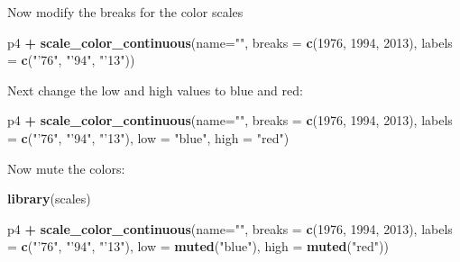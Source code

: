 \documentclass[]{book}
\newenvironment{Shaded}{\begin{snugshade}}{\end{snugshade}}
\newcommand{\KeywordTok}[1]{\textcolor[rgb]{0.13,0.29,0.53}{\textbf{#1}}}
\newcommand{\DataTypeTok}[1]{\textcolor[rgb]{0.13,0.29,0.53}{#1}}
\newcommand{\DecValTok}[1]{\textcolor[rgb]{0.00,0.00,0.81}{#1}}
\newcommand{\StringTok}[1]{\textcolor[rgb]{0.31,0.60,0.02}{#1}}
\newcommand{\OperatorTok}[1]{\textcolor[rgb]{0.81,0.36,0.00}{\textbf{#1}}}
\newcommand{\NormalTok}[1]{#1}
\begin{document}
Now modify the breaks for the color scales

\begin{Shaded}
\begin{Highlighting}[]
\NormalTok{p4 }\OperatorTok{+}\StringTok{ }
\StringTok{  }\KeywordTok{scale_color_continuous}\NormalTok{(}\DataTypeTok{name=}\StringTok{""}\NormalTok{,}
                         \DataTypeTok{breaks =} \KeywordTok{c}\NormalTok{(}\DecValTok{1976}\NormalTok{, }\DecValTok{1994}\NormalTok{, }\DecValTok{2013}\NormalTok{),}
                         \DataTypeTok{labels =} \KeywordTok{c}\NormalTok{(}\StringTok{"'76"}\NormalTok{, }\StringTok{"'94"}\NormalTok{, }\StringTok{"'13"}\NormalTok{))}
\end{Highlighting}
\end{Shaded}

Next change the low and high values to blue and red:

\begin{Shaded}
\begin{Highlighting}[]
\NormalTok{p4 }\OperatorTok{+}
\StringTok{  }\KeywordTok{scale_color_continuous}\NormalTok{(}\DataTypeTok{name=}\StringTok{""}\NormalTok{,}
                         \DataTypeTok{breaks =} \KeywordTok{c}\NormalTok{(}\DecValTok{1976}\NormalTok{, }\DecValTok{1994}\NormalTok{, }\DecValTok{2013}\NormalTok{),}
                         \DataTypeTok{labels =} \KeywordTok{c}\NormalTok{(}\StringTok{"'76"}\NormalTok{, }\StringTok{"'94"}\NormalTok{, }\StringTok{"'13"}\NormalTok{),}
                         \DataTypeTok{low =} \StringTok{"blue"}\NormalTok{, }\DataTypeTok{high =} \StringTok{"red"}\NormalTok{)}
\end{Highlighting}
\end{Shaded}

Now mute the colors:

\begin{Shaded}
\begin{Highlighting}[]
\KeywordTok{library}\NormalTok{(scales)}

\NormalTok{p4 }\OperatorTok{+}
\StringTok{  }\KeywordTok{scale_color_continuous}\NormalTok{(}\DataTypeTok{name=}\StringTok{""}\NormalTok{,}
                         \DataTypeTok{breaks =} \KeywordTok{c}\NormalTok{(}\DecValTok{1976}\NormalTok{, }\DecValTok{1994}\NormalTok{, }\DecValTok{2013}\NormalTok{),}
                         \DataTypeTok{labels =} \KeywordTok{c}\NormalTok{(}\StringTok{"'76"}\NormalTok{, }\StringTok{"'94"}\NormalTok{, }\StringTok{"'13"}\NormalTok{),}
                         \DataTypeTok{low =} \KeywordTok{muted}\NormalTok{(}\StringTok{"blue"}\NormalTok{), }\DataTypeTok{high =} \KeywordTok{muted}\NormalTok{(}\StringTok{"red"}\NormalTok{))}
\end{Highlighting}
\end{Shaded}
\end{document}
